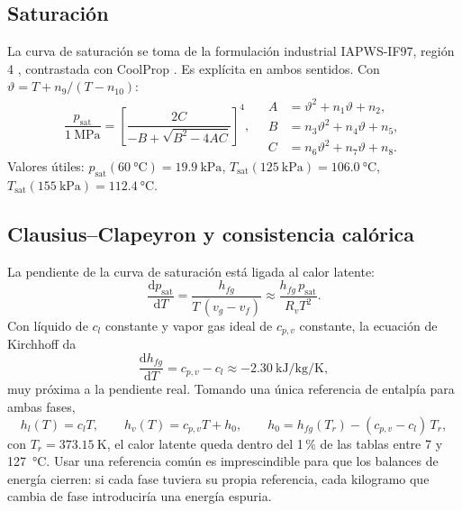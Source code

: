 \documentclass[11pt,a4paper]{article}
\newcommand{\dd}{\mathrm{d}}
\newcommand{\psat}{p_{\mathrm{sat}}}
\newcommand{\Tsat}{T_{\mathrm{sat}}}
\newcommand{\hfg}{h_{fg}}
\begin{document}
\subsection{Saturación}

La curva de saturación se toma de la formulación industrial IAPWS-IF97, región 4 \cite{iapws}, contrastada con CoolProp \cite{bell}. Es explícita en ambos sentidos. Con $\vartheta = T + n_9/(T-n_{10})$:
\begin{equation}
\frac{\psat}{\SI{1}{\mega\pascal}} = \left[\frac{2C}{-B+\sqrt{B^2-4AC}}\right]^4,\quad
\begin{aligned}
A &= \vartheta^2 + n_1\vartheta + n_2,\\
B &= n_3\vartheta^2 + n_4\vartheta + n_5,\\
C &= n_6\vartheta^2 + n_7\vartheta + n_8 .
\end{aligned}
\end{equation}
Valores útiles: $\psat(\SI{60}{\celsius})=\SI{19.9}{\kilo\pascal}$, $\Tsat(\SI{125}{\kilo\pascal})=\SI{106.0}{\celsius}$, $\Tsat(\SI{155}{\kilo\pascal})=\SI{112.4}{\celsius}$.

\subsection{Clausius--Clapeyron y consistencia calórica}

La pendiente de la curva de saturación está ligada al calor latente:
\begin{equation}
\frac{\dd\psat}{\dd T} = \frac{\hfg}{T\,(v_g - v_f)} \approx \frac{\hfg\,\psat}{R_v T^2}.
\end{equation}
Con líquido de $c_l$ constante y vapor gas ideal de $c_{p,v}$ constante, la ecuación de Kirchhoff da
\begin{equation}
\frac{\dd\hfg}{\dd T} = c_{p,v} - c_l \approx \SI{-2.30}{\kilo\joule\per\kilo\gram\per\kelvin},
\end{equation}
muy próxima a la pendiente real. Tomando una única referencia de entalpía para ambas fases,
\begin{equation}
h_l(T) = c_l T,\qquad h_v(T) = c_{p,v} T + h_0,\qquad h_0 = \hfg(T_r) - (c_{p,v}-c_l)\,T_r ,
\end{equation}
con $T_r=\SI{373.15}{\kelvin}$, el calor latente queda dentro del 1\,\% de las tablas entre 7 y \SI{127}{\celsius}. Usar una referencia común es imprescindible para que los balances de energía cierren: si cada fase tuviera su propia referencia, cada kilogramo que cambia de fase introduciría una energía espuria.
\end{document}
